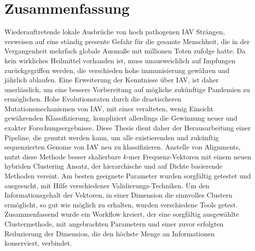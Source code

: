 \chapter*{Zusammenfassung}

Wiederauftretende lokale Ausbrüche von hoch pathogenen \gls{IAV} Strängen, verweisen auf eine ständig presente Gefahr für die gesamte Menschheit, die in der Vergangenheit mehrfach globale Ausmaße mit millionen Toten zufolge hatte. Da kein wirkliches Heilmittel vorhanden ist, muss unausweichlich auf Impfungen zurückgegriffen werden, die verschieden hohe immunisierung gewähren und jährlich ablaufen. Eine Erweiterung der Kenntnisse über \gls{IAV}, ist daher unerlässlich, um eine bessere Vorbereitung auf mögliche zukünftige Pandemien zu ermöglichen. Hohe Evolutionsraten durch die drastischeren Mutationsmechanismen von \gls{IAV}, mit einer veralteten, wenig Einsicht gewährenden Klassifizierung, kompliziert allerdings die Gewinnung neuer und exakter Forschungsergebnisse. Diese Thesis dient daher der Herausarbeitung einer Pipeline, die genutzt werden kann, um alle existierenden und zukünftig sequenzierten Genome von \gls{IAV} neu zu klassifizieren. Anstelle von Alignments, nutzt diese Methode besser skalierbare $k$-mer Frequenz-Vektoren mit einem neuen hybriden Clustering Ansatz, der hierarchische und auf Dichte basierende Methoden vereint. Am besten geeignete Parameter wurden sorgfältig getestet und ausgesucht, mit Hilfe verschiedener Validierungs-Techniken. Um den Informationsgehalt der Vektoren, in einer Dimension die sinnvolles Clustern ermöglicht, so gut wie möglich zu erhalten, wurden verschiedene Tools getest. Zusammenfassend wurde ein Workflow kreiert, der eine sorgfältig ausgewählte Clustermethode, mit angebrachten Parametern und einer zuvor erfolgten Reduzierung der Dimension, die den höchste Menge an Informationen konserviert, verbindet.
